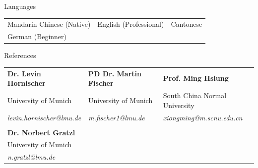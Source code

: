 \documentclass{resume}
\begin{document}
\begin{rSection}{Languages}
\begin{tabular}{p{} p{} p{}}
Mandarin Chinese (Native) & English (Professional) & Cantonese \\
German (Beginner) & & \\
\end{tabular}
\end{rSection}

\begin{rSection}{References}
\vspace{0.4cm}
\begin{tabular}{@{} p{} p{} p{} @{}}
\textbf{Dr. Levin Hornischer} & \textbf{PD Dr. Martin Fischer} & \textbf{Prof. Ming Hsiung} \\
University of Munich & University of Munich & South China Normal University \\
\textit{levin.hornischer@lmu.de} & \textit{m.fischer1@lmu.de} & \textit{xiongming@m.scnu.edu.cn} \\
\vspace{0.4cm} & \vspace{0.4cm} & \vspace{0.4cm} \\
\textbf{Dr. Norbert Gratzl} & & \\
University of Munich & & \\
\textit{n.gratzl@lmu.de} & & \\
\end{tabular}
\end{rSection}
\end{document}
